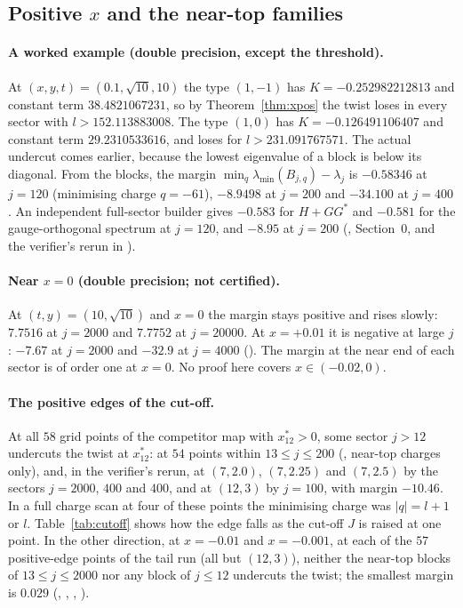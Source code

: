 \documentclass[11pt]{article}
\theoremstyle{definition}
\theoremstyle{remark}
\begin{document}
\subsection{Positive \texorpdfstring{$x$}{x} and the near-top families}\label{app:xpos}

\paragraph{A worked example (double precision, except the threshold).} At $(x,y,t)=(0.1,\sqrt{10},10)$ the type
$(1,-1)$ has $K=-0.252982212813$ and constant term $38.4821067231$, so by Theorem~\ref{thm:xpos} the twist loses in
every sector with $l>152.113883008$. The type $(1,0)$ has $K=-0.126491106407$ and constant term $29.2310533616$, and
loses for $l>231.091767571$. The actual undercut comes earlier, because the lowest eigenvalue of a block is below its
diagonal. From the blocks, the margin $\min_q\lambda_{\min}(B_{j,q})-\lambda_j$ is $-0.58346$ at $j=120$ (minimising
charge $q=-61$), $-8.9498$ at $j=200$ and $-34.100$ at $j=400$. An independent full-sector builder gives $-0.583$
for $H+GG^*$ and $-0.581$ for the gauge-orthogonal spectrum at $j=120$, and $-8.95$ at $j=200$
(, Section~0, and the verifier's rerun in
).

\paragraph{Near $x=0$ (double precision; not certified).} At $(t,y)=(10,\sqrt{10})$ and $x=0$ the margin stays
positive and rises slowly: $7.7516$ at $j=2000$ and $7.7752$ at $j=20000$. At $x=+0.01$ it is negative at large $j$:
$-7.67$ at $j=2000$ and $-32.9$ at $j=4000$ (). The margin at the near end of each sector is
of order one at $x=0$. No proof here covers $x\in(-0.02,0)$.

\paragraph{The positive edges of the cut-off.} At all $58$ grid points of the competitor map with $x^*_{12}>0$, some
sector $j>12$ undercuts the twist at $x^*_{12}$: at $54$ points within $13\le j\le200$ (,
near-top charges only), and, in the verifier's rerun, at $(7,2.0)$, $(7,2.25)$ and $(7,2.5)$ by the sectors $j=2000$,
$400$ and $400$, and at $(12,3)$ by $j=100$, with margin $-10.46$. In a full charge scan at four of these points the
minimising charge was $|q|=l+1$ or $l$. Table~\ref{tab:cutoff} shows how the edge falls as the cut-off $J$ is raised at
one point. In the other direction, at $x=-0.01$ and $x=-0.001$, at each of the $57$ positive-edge points of the tail run
(all but $(12,3)$), neither the near-top blocks of $13\le j\le2000$ nor any block of $j\le12$ undercuts the twist; the
smallest margin is $0.029$ (, , ,
).
\end{document}
